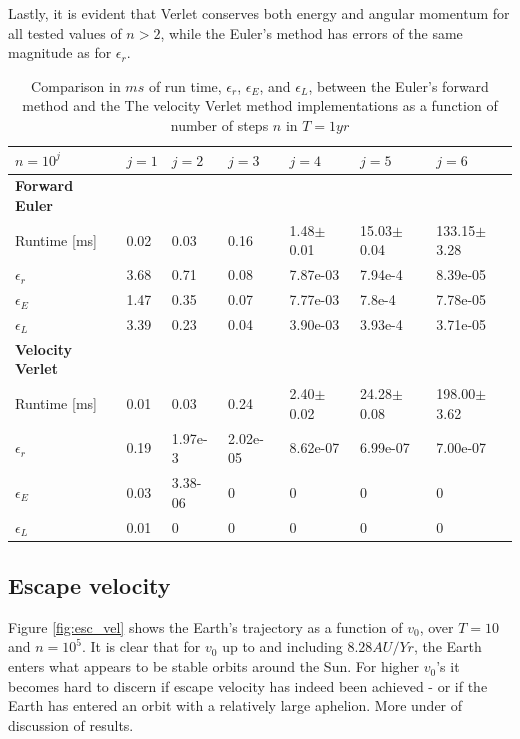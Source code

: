 \documentclass[%
oneside,                 %
final,                   %
10pt]{article}
\begin{document}
Lastly, it is evident that Verlet conserves both energy and angular momentum for all tested values of $n>2$, while the Euler's method has errors of the same magnitude as for $\epsilon_r$.

   
\begin{table}[h]
\begin{tabular}{|l|l|l|l|l|l|l|}
\hline
$n=10^j$         & $j=1$      & $j=2$       & $j=3$       & $j=4$         & $j=5$          & $j=6$           \\\hline
\textbf{Forward Euler}    &            &             &             &               &                &                 \\\hline
Runtime {[}ms{]} & 0.02       & 0.03        & 0.16        & 1.48$\pm$0.01 & 15.03$\pm$0.04 & 133.15$\pm$3.28 \\\hline
$\epsilon_r$     & 3.68    & 0.71    & 0.08    & 7.87e-03   & 7.94e-4    & 8.39e-05     \\\hline
$\epsilon_E$     & 1.47   & 0.35    & 0.07  & 7.77e-03    & 7.8e-4    & 7.78e-05     \\\hline
$\epsilon_L$     & 3.39    & 0.23    & 0.04   & 3.90e-03    & 3.93e-4    & 3.71e-05     \\\hline
\textbf{Velocity Verlet}  &            &             &             &               &                &                 \\\hline
Runtime {[}ms{]} & 0.01       & 0.03        & 0.24        & 2.40$\pm$0.02 & 24.28$\pm$0.08 & 198.00$\pm$3.62 \\\hline
$\epsilon_r$     & 0.19   & 1.97e-3  & 2.02e-05 & 8.62e-07   & 6.99e-07    & 7.00e-07     \\\hline
$\epsilon_E$     & 0.03  & 3.38-06 & 0           & 0             & 0              & 0               \\\hline
$\epsilon_L$     & 0.01 & 0           & 0           & 0             & 0              & 0              
\\ \hline
\end{tabular}
\caption{Comparison in $ms$ of run time, $\epsilon_r$, $\epsilon_E$, and $\epsilon_L$, between the Euler's forward method and the The velocity Verlet method implementations as a function of number of steps $n$ in $T=1 yr$}
\label{tab:EulerVsVerlet}
\end{table}
    
 
\subsection{Escape velocity}
Figure \ref{fig:esc_vel} shows the Earth's trajectory as a function of $v_0$, over $T=10$ and $n=10^5$. It is clear that for $v_0$ up to and including $8.28 AU/Yr$, the Earth enters what appears to be stable orbits around the Sun. For higher $v_0$'s it becomes hard to discern if escape velocity has indeed been achieved - or if the Earth has entered an orbit with a relatively large aphelion. More under of discussion of results. 
\end{document}
